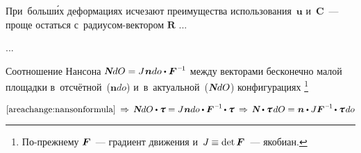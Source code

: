 \begin{otherlanguage}{russian}
При~больш\'{и}х деформациях исчезают преимущества использования~$\bm{u}$ и~$\bm{C}$~--- проще остаться с~радиусом\hbox{-}вектором $\bm{R}$ ...

...



\newpage



\label{para:piolakirchhoffstresstensor}

Соотношение Нансона ${\mathboldN dO = J \hspace{.1ex} \bm{n} do \dotp \bm{F}^{\hspace{.1ex}\expminusone} \hspace{-0.1ex}}$ между векторами бесконечно малой площадки в~отсчётной~(${\bm{n} do}$) и~в~актуальной~(${\mathboldN dO}$) конфигурациях%
\footnote{По\hbox{-}прежнему ${\bm{F}\hspace{-0.12ex}}$~--- градиент движения и~${J \hspace{-0.1ex} \equiv \operatorname{det} \bm{F}\hspace{-0.12ex}}$~--- якобиан.}

\nopagebreak\vspace{-0.12em}\begin{equation*}
\eqref{areachange:nansonformula} \:\Rightarrow\,
\mathboldN dO \dotp \cauchystress = J \hspace{.1ex} \bm{n} do \dotp \bm{F}^{\hspace{.1ex}\expminusone} \hspace{-0.2ex} \dotp \cauchystress
\:\Rightarrow\,
\mathboldN \dotp \cauchystress \hspace{.25ex} dO = \hspace{.1ex} \bm{n} \dotp J \bm{F}^{\hspace{.1ex}\expminusone} \hspace{-0.2ex} \dotp \cauchystress \hspace{.2ex} do
\end{equation*}


\end{otherlanguage}
